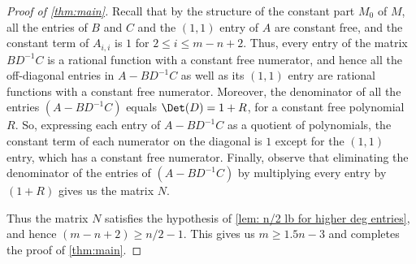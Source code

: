 \begin{proof}[Proof of \autoref{thm:main}]
Recall that by the structure of the constant part $M_0$ of $M$, all the entries of $B$ and $C$ and the $(1,1)$ entry of $A$ are constant free, and the constant term of $A_{i,i}$ is $1$ for $2 \le i \le m-n+2$. Thus, every entry of the matrix $BD^{-1}C$ is a rational function with a constant free numerator, and hence all the off-diagonal entries in $A - BD^{-1}C$ as well as its $(1,1)$ entry are rational functions with a constant free numerator. Moreover, the denominator of all the entries $\left(A - BD^{-1}C\right)$  equals $\Det(D) = 1 + R$, for a constant free polynomial $R$. So, expressing each entry of $A-BD^{-1}C$ as a quotient of polynomials, the constant term of each numerator on the diagonal  is $1$ except for the $(1,1)$ entry, which has a constant free numerator.  Finally, observe that eliminating the denominator of the entries of  $\left(A - BD^{-1}C\right)$ by multiplying every entry by $(1 + R)$ gives us the  matrix $N$.

Thus the matrix $N$ satisfies the hypothesis of \autoref{lem: n/2 lb for higher deg entries}, and hence $(m - n + 2) \geq n/2 -1$. This gives us $m \geq 1.5n - 3$ and completes the proof of \autoref{thm:main}.  
\end{proof}














